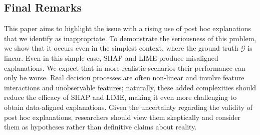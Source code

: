 \documentclass[mnsc,blindrev]{informs3}
\newcommand{\tw}[1]{\textcolor{red}{Tong: #1}}
\begin{document}
\subsection{Final Remarks}%
This paper aims to highlight the issue with a rising use of post hoc explanations that we identify as inappropriate. To demonstrate the seriousness of this problem, we show that it occurs even in the simplest context, where the ground truth $\mathcal{G}$ is linear. Even in this simple case, SHAP and LIME produce misaligned explanations. We expect that in more realistic scenarios their performance can only be worse. Real decision processes are often non-linear and involve feature interactions and unobservable features; naturally, these added complexities should reduce the efficacy of SHAP and LIME, making it even more challenging to obtain data-aligned explanations. Given the uncertainty regarding the validity of post hoc explanations, researchers should view them skeptically and consider them as hypotheses rather than definitive claims about reality. 

 


        
\end{document}
